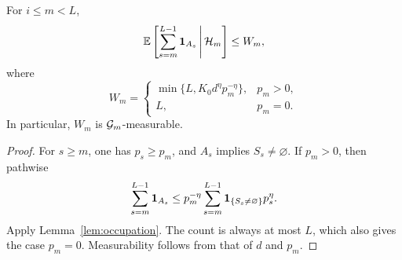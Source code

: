 \begin{corollary}
\label{cor:remaining-duration}
For $i\le m<L$,
\begin{equation}
    \mathbb E\left[
      \sum_{s=m}^{L-1}\mathbf 1_{A_s}
      \,\middle|\,\mathcal H_m
    \right]
    \le W_m,
    \label{eq:remaining-duration}
\end{equation}
where
\begin{equation}
    W_m=
    \begin{cases}
      \min\{L,K_0d^\eta p_m^{-\eta}\},&p_m>0,\\
      L,&p_m=0.
    \end{cases}
    \label{eq:W-definition}
\end{equation}
In particular, $W_m$ is $\mathcal G_m$-measurable.
\end{corollary}

\begin{proof}
For $s\ge m$, one has $p_s\ge p_m$, and $A_s$ implies
$S_s\ne\varnothing$.  If $p_m>0$, then pathwise
\[
    \sum_{s=m}^{L-1}\mathbf 1_{A_s}
    \le
    p_m^{-\eta}
    \sum_{s=m}^{L-1}
      \mathbf 1_{\{S_s\ne\varnothing\}}p_s^\eta.
\]
Apply Lemma~\ref{lem:occupation}.  The count is always at most $L$, which
also gives the case $p_m=0$.  Measurability follows from that of $d$ and
$p_m$.
\end{proof}
